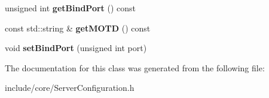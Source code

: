 \begin{DoxyCompactItemize}
\item 
\hypertarget{class_f_t_p_1_1_server_configuration_a511395794c7c6ec3d14241ae46089891}{unsigned int {\bfseries get\-Bind\-Port} () const }\label{class_f_t_p_1_1_server_configuration_a511395794c7c6ec3d14241ae46089891}

\item 
\hypertarget{class_f_t_p_1_1_server_configuration_a6a943d6b2299fcc9e335ae8afad8a565}{const std\-::string \& {\bfseries get\-M\-O\-T\-D} () const }\label{class_f_t_p_1_1_server_configuration_a6a943d6b2299fcc9e335ae8afad8a565}

\item 
\hypertarget{class_f_t_p_1_1_server_configuration_a4fc696bd9844369a9c494b4df1d6e87e}{void {\bfseries set\-Bind\-Port} (unsigned int port)}\label{class_f_t_p_1_1_server_configuration_a4fc696bd9844369a9c494b4df1d6e87e}

\end{DoxyCompactItemize}


The documentation for this class was generated from the following file\-:\begin{DoxyCompactItemize}
\item 
include/core/Server\-Configuration.\-h\end{DoxyCompactItemize}
